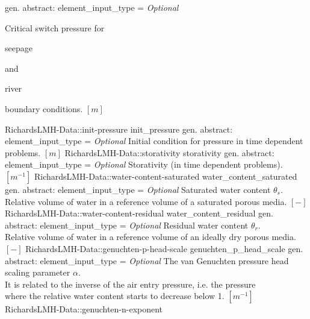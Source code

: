 \begin{RecordType}
			{{gen. abstract: }}{{element{\_}input{\_}type}{ = }}
			{ \it{Optional}}
			{{{Critical switch pressure for }\begin{ttfamily}seepage\end{ttfamily}{ and }\begin{ttfamily}river\end{ttfamily}{ boundary conditions. }{$[m]$}%
}}
		\RecKey
			{RichardsLMH-Data::init-pressure}
			{init{\_}pressure}
			{{gen. abstract: }}{{element{\_}input{\_}type}{ = }}
			{ \it{Optional}}
			{{{Initial condition for pressure in time dependent problems. }{$[m]$}%
}}
		\RecKey
			{RichardsLMH-Data::storativity}
			{storativity}
			{{gen. abstract: }}{{element{\_}input{\_}type}{ = }}
			{ \it{Optional}}
			{{{Storativity (in time dependent problems). }{$[m^{-1}]$}%
}}
		\RecKey
			{RichardsLMH-Data::water-content-saturated}
			{water{\_}content{\_}saturated}
			{{gen. abstract: }}{{element{\_}input{\_}type}{ = }}
			{ \it{Optional}}
			{{{Saturated water content }{$ \theta_s $}{.}\\{
                Relative volume of water in a reference volume of a saturated porous media. }{$[-]$}%
}}
		\RecKey
			{RichardsLMH-Data::water-content-residual}
			{water{\_}content{\_}residual}
			{{gen. abstract: }}{{element{\_}input{\_}type}{ = }}
			{ \it{Optional}}
			{{{Residual water content }{$ \theta_r $}{.}\\{
                Relative volume of water in a reference volume of an ideally dry porous media. }{$[-]$}%
}}
		\RecKey
			{RichardsLMH-Data::genuchten-p-head-scale}
			{genuchten{\_}p{\_}head{\_}scale}
			{{gen. abstract: }}{{element{\_}input{\_}type}{ = }}
			{ \it{Optional}}
			{{{The van Genuchten pressure head scaling parameter }{$ \alpha $}{.}\\{
                It is related to the inverse of the air entry pressure, i.e. the pressure}\\{
                where the relative water content starts to decrease below 1. }{$[m^{-1}]$}%
}}
		\RecKey
			{RichardsLMH-Data::genuchten-n-exponent}

\end{RecordType}
